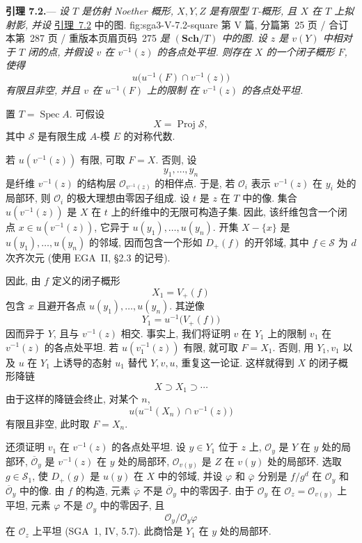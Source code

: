
\medskip
{}\label{lem:sga3-V-7.2}%
\noindent\textbf{引理 7.2.}---%
\emph{设 \(T\) 是仿射 Noether 概形, \(X,Y,Z\) 是有限型
\(T\)-概形, 且 \(X\) 在 \(T\) 上拟射影, 并设}
  {\hyperref[lem:sga3-V-7.2]{引理~7.2} 中的图.}
  {fig:sga3-V-7.2-square}
  {第 V 篇, 分篇第~25 页 / 合订本第~287 页 / 重版本页眉页码~275}
\emph{是 \((\mathbf{Sch}/T)\) 中的图.
设 \(z\) 是 \(v(Y)\) 中相对于 \(T\) 闭的点,
并假设 \(v\) 在 \(v^{-1}(z)\) 的各点处平坦.
则存在 \(X\) 的一个闭子概形 \(F\), 使得
\[
  u\bigl(u^{-1}(F)\cap v^{-1}(z)\bigr)
\]
有限且非空, 并且 \(v\) 在 \(u^{-1}(F)\) 上的限制
在 \(v^{-1}(z)\) 的各点处平坦.}

置 \(T=\operatorname{Spec}A\). 可假设
\[
  X=\operatorname{Proj}\mathscr S,
\]
其中 \(\mathscr S\) 是有限生成 \(A\)-模 \(E\) 的对称代数.

若 \(u(v^{-1}(z))\) 有限, 可取 \(F=X\). 否则, 设
\[
  y_1,\ldots,y_n
\]
是纤维 \(v^{-1}(z)\) 的结构层 \(\mathcal O_{v^{-1}(z)}\) 的相伴点.
于是, 若 \(\mathcal O_i\) 表示 \(v^{-1}(z)\)
在 \(y_i\) 处的局部环, 则 \(\mathcal O_i\) 的极大理想由零因子组成.
设 \(t\) 是 \(z\) 在 \(T\) 中的像.
集合 \(u(v^{-1}(z))\) 是 \(X\) 在 \(t\) 上的纤维中的无限可构造子集.
因此, 该纤维包含一个闭点 \(x\in u(v^{-1}(z))\),
它异于 \(u(y_1),\ldots,u(y_n)\).
开集 \(X-\{x\}\) 是 \(u(y_1),\ldots,u(y_n)\) 的邻域,
因而包含一个形如 \(D_+(f)\) 的开邻域,
其中 \(f\in\mathscr S\) 为 \(d\) 次齐次元
(使用 EGA~II, \S2.3 的记号).

因此, 由 \(f\) 定义的闭子概形
\[
  X_1=V_+(f)
\]
包含 \(x\) 且避开各点 \(u(y_1),\ldots,u(y_n)\).
其逆像
\[
  Y_1=u^{-1}\bigl(V_+(f)\bigr)
\]
因而异于 \(Y\), 且与 \(v^{-1}(z)\) 相交.
事实上, 我们将证明 \(v\) 在 \(Y_1\) 上的限制 \(v_1\)
在 \(v^{-1}(z)\) 的各点处平坦.
若 \(u(v_1^{-1}(z))\) 有限, 就可取 \(F=X_1\).
否则, 用 \(Y_1,v_1\) 以及 \(u\) 在 \(Y_1\) 上诱导的态射
\(u_1\) 替代 \(Y,v,u\), 重复这一论证.
这样就得到 \(X\) 的闭子概形降链
\[
  X\supset X_1\supset\cdots
\]
由于这样的降链会终止, 对某个 \(n\),
\[
  u\bigl(u^{-1}(X_n)\cap v^{-1}(z)\bigr)
\]
有限且非空, 此时取 \(F=X_n\).

还须证明 \(v_1\) 在 \(v^{-1}(z)\) 的各点处平坦.
设 \(y\in Y_1\) 位于 \(z\) 上,
\(\mathcal O_y\) 是 \(Y\) 在 \(y\) 处的局部环,
\(\overline{\mathcal O}_y\) 是 \(v^{-1}(z)\) 在 \(y\) 处的局部环,
\(\mathcal O_{v(y)}\) 是 \(Z\) 在 \(v(y)\) 处的局部环.
选取 \(g\in\mathscr S_1\), 使 \(D_+(g)\) 是 \(u(y)\) 在 \(X\) 中的邻域,
并设 \(\varphi\) 和 \(\overline\varphi\)
分别是 \(f/g^d\) 在 \(\mathcal O_y\) 和 \(\overline{\mathcal O}_y\) 中的像.
由 \(f\) 的构造, 元素 \(\overline\varphi\)
不是 \(\overline{\mathcal O}_y\) 中的零因子.
由于 \(\mathcal O_y\) 在 \(\mathcal O_z=\mathcal O_{v(y)}\) 上平坦,
元素 \(\varphi\) 不是 \(\mathcal O_y\) 中的零因子, 且
\[
  \mathcal O_y/\mathcal O_y\varphi
\]
在 \(\mathcal O_z\) 上平坦 (SGA~1, IV, 5.7).
此商恰是 \(Y_1\) 在 \(y\) 处的局部环.

